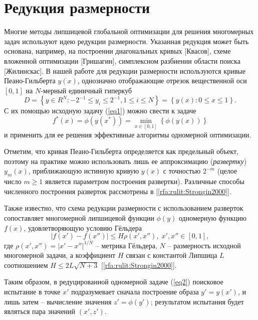 \documentclass[10pt,a4paper]{book}
\begin{document}
\section{Редукция размерности}\label{sec:reduction}

Многие методы липшицевой глобальной оптимизации для решения многомерных задач используют идею редукции размерности. Указанная редукция может быть основана, например, на построении диагональных кривых [\colorbox[rgb]{1,1,0.6}{Квасов}], схеме вложенной оптимизации [\colorbox[rgb]{1,1,0.6}{Гришагин}], симплексном разбиении области поиска [\colorbox[rgb]{1,1,0.6}{Жилинскас}].
В нашей работе для редукции размерности используются кривые Пеано-Гильберта $y(x)$, однозначно отображающие отрезок вещественной оси  $[0,1]$ на $N$-мерный единичный гиперкуб
\begin{equation}\label{eq2_} 
D=\left\{ y \in R^N: -2^{-1} \leq y_i \leq 2^{-1}, 1 \leq i \leq N \right\} = \left\{ y(x): 0 \leq x \leq 1 \right\}.
\end{equation}
С их помощью исходную задачу (\ref{eq1}) можно свести к задаче 
\begin{equation}\label{eq2} 
f^*(x)=\phi(y(x^* ))=\min_{x \in [0,1]} \left\{ \phi(y(x)) \right\}
\end{equation}
и применить для ее решения эффективные алгоритмы одномерной оптимизации. 

Отметим, что кривая Пеано-Гильберта определяется как предельный объект, поэтому на практике можно использовать лишь ее аппроксимацию (\textit{развертку}) $y_m(x)$, приближающую истинную кривую $y(x)$ с точностью $2^{-m}$ (целое число $m \geq 1$ является параметром построения развертки). Различные способы численного построения разверток рассмотрены в [\ref{rfa:rulit:Strongin2000}].

Также известно, что схема редукции размерности с использованием разверток сопоставляет многомерной липшицевой функции $\phi(y)$ одномерную функцию $f(x)$, удовлетворяющую условию Гёльдера
\begin{equation}\label{eq4} 
| f(x')-f(x'') | \leq H \rho(x',x''), \; x',x'' \in [0,1],
\end{equation}
где $\rho(x',x'') =  |x' - x''|^{1/N}$ -- метрика Гёльдера, $N$ -- размерность исходной многомерной задачи, а коэффициент $H$ связан с константой Липшица $L$ соотношением $H \leq 2L\sqrt {N+3}$ [\ref{rfa:rulit:Strongin2000}].

Таким образом, в редуцированной одномерной задаче (\ref{eq2}) поисковое испытание в точке $x'$ подразумевает сначала построение образа $y' = y(x')$, и лишь затем -- вычисление значения $z'=\phi(y')$; результатом испытания будет являться пара значений $(x',z')$.
\end{document}

